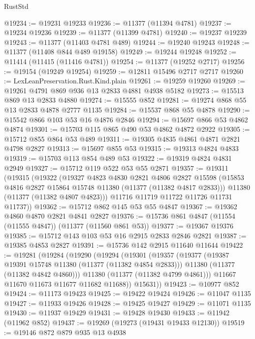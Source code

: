 \begin{lexlean}{RustStd}
\begin{coremodule}
@19234 := @19231 @19233
@19236 := @11377 (@11394 @4781)
@19237 := @19234 @19236
@19239 := @11377 (@11399 @4781)
@19240 := @19237 @19239
@19243 := @11377 (@11403 @4781 @489)
@19244 := @19240 @19243
@19248 := @11377 (@11408 @844 @489 @19158)
@19249 := @19244 @19248
@19252 := @11414 (@11415 (@11416 @4781))
@19254 := @11377 (@19252 @2717)
@19256 := @19154 (@19249 @19254)
@19259 := @12811 @15496 @2717 @2717
@19260 := LexLeanPreservation.Rust.Kind.plain
@19261 := @19259 @19260
@19269 := @19261 @4791 @869 @936 @13 @2833 @4881 @4938 @5182
@19273 := @15513 @869 @13 @2833 @4880
@19274 := @15555 @852
@19281 := @19274 @868 @55 @13 @2833 @4878 @2777 @1135
@19284 := @15537 @868 @55 @4878
@19290 := @15542 @866 @103 @53 @16 @4876 @2846
@19294 := @15697 @866 @53 @4862 @4874
@19301 := @15703 @115 @865 @490 @53 @4862 @4872 @2922
@19305 := @15712 @855 @864 @53 @489
@19311 := @19305 @4835 @4861 @4871 @2821 @4798 @2827
@19313 := @15697 @855 @53
@19315 := @19313 @4824 @4833
@19319 := @15703 @113 @854 @489 @53
@19322 := @19319 @4824 @4831 @2949
@19327 := @15712 @119 @522 @53 @55 @2871
@19357 := @19311
    (@19315
      (@19322
        (@19327
          @4823
          @4830
          @2821
          @4806
          @2827
          @15598
          (@15853 @4816 @2827 @15864 @15748 @11380 (@11377 (@11382 @4817 @2833)))
          @11380
          (@11377 (@11382 @4807 @4823)))
        @11716
        @11719
        @11722
        @11726
        @11731
        @11737))
@19362 := @15712 @862 @145 @53 @55 @4847
@19367 := @19362 @4860 @4870 @2821 @4841 @2827
@19376 := @15736 @861 @4847 (@11554 (@11555 @4847)) (@11377 (@11560 @861 @53))
@19377 := @19367 @19376
@19385 := @15712 @143 @103 @53 @16 @2915 @2833 @2846 @2821
@19387 := @19385 @4853 @2827
@19391 := @15736 @142 @2915 @11640 @11644
@19422 := @19281
    (@19284
      (@19290
        (@19294
          (@19301
            (@19357
              (@19377
                (@19387 @19391 @15748 @11380 (@11377 (@11382 @4854 @2833)))
                @11380
                (@11377 (@11382 @4842 @4860)))
              @11380
              (@11377 (@11382 @4799 @4861)))
            @11667
            @11670
            @11673
            @11677
            @11682
            @11688))
        @15631))
@19423 := @10977 @852
@19424 := @11173 @19423
@19425 := @19422 @19424
@19426 := @11047 @1135
@19427 := @11933 @19426
@19428 := @19425 @19427
@19429 := @11071 @1135
@19430 := @11937 @19429
@19431 := @19428 @19430
@19433 := @11942 (@11962 @852)
@19437 := @19269 (@19273 (@19431 @19433 @12130))
@19519 := @19146
    @872
    @879
    @935
    @13
    @4938

\end{coremodule}
\end{lexlean}
